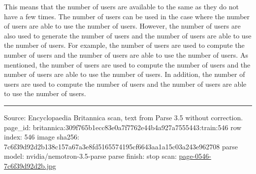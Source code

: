 \documentclass[10pt]{article}
\begin{document}
This means that the number of users are available to the same as they do not have a few times. The number of users can be used in the case where the number of users are able to use the number of users. However, the number of users are also used to generate the number of users and the number of users are able to use the number of users. For example, the number of users are used to compute the number of users and the number of users are able to use the number of users. As mentioned, the number of users are used to compute the number of users and the number of users are able to use the number of users. In addition, the number of users are used to compute the number of users and the number of users are able to use the number of users.

\vfill\par\noindent\rule{\linewidth}{0.4pt}\par
{\scriptsize\color{gray}\noindent Source: Encyclopaedia Britannica scan, text from Parse 3.5 without correction. page\_id: britannica:309f765b1ecc83e0a7f7762e44b4a927a7555443:train:546 \quad row index: 546 \quad image sha256: 7c6f39d92d2b138c157a67a3e8fd5165574195cf6643aa1a15c03a243e962708 \quad parse model: nvidia/nemotron-3.5-parse \quad parse finish: stop \quad scan: \href{../scans/page-0546-7c6f39d92d2b.jpg}{page-0546-7c6f39d92d2b.jpg}\par}
\end{document}

